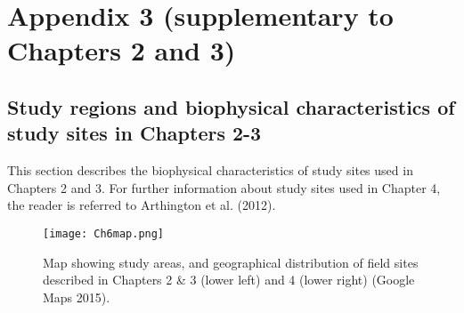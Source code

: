 
\chapter[Appendix 3 (supplementary to Chapters 2 and 3)]{Appendix 3 (supplementary to Chapters 2 and 3)}

\section*{Study regions and biophysical characteristics of study sites in Chapters 2-3}

This section describes the biophysical characteristics of study sites used in Chapters 2 and 3. For further information about study sites used in Chapter 4, the reader is referred to Arthington et al. (2012).

\begin{figure}[ht]
\begin{center}
\texttt{[image: Ch6map.png]} %
\caption[Map of study areas described in Chapters 2-4.]{\small{Map showing study areas, and geographical distribution of field sites described in Chapters 2 \& 3 (lower left) and 4 (lower right) (Google Maps 2015).}\label{fig:Ch6_F1}}
\end{center}
\end{figure}   
\clearpage


